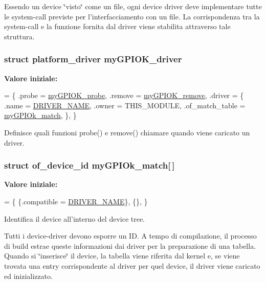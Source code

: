 Essendo un device \char`\"{}visto\char`\"{} come un file, ogni device driver deve implementare tutte le system-\/call previste per l'interfacciamento con un file. La corrispondenza tra la system-\/call e la funzione fornita dal driver viene stabilita attraverso tale struttura. \hypertarget{group___kernel-_module_ga8dba1541b58fa63f8208232ffce4fc47}{
\subsubsection[{my\+G\+P\+I\+O\+K\+\_\+driver}]{\setlength{\rightskip}{0pt plus 5cm}struct platform\+\_\+driver my\+G\+P\+I\+O\+K\+\_\+driver\hspace{0.3cm}{\ttfamily [static]}}}\label{group___kernel-_module_ga8dba1541b58fa63f8208232ffce4fc47}
{\bfseries Valore iniziale\+:}
\begin{DoxyCode}
= \{
        .probe = \hyperlink{group___kernel-_module_gae40973a06d72f7c41a9af07513a62307}{myGPIOK\_probe},
        .remove = \hyperlink{group___kernel-_module_ga59fddfaa36dea357f4bbdfceb0f47f8c}{myGPIOK\_remove},
        .driver = \{
                .name = \hyperlink{group___kernel-_module_ga25634d21648ca7fb7a2aca614bafaaeb}{DRIVER\_NAME},
                .owner = THIS\_MODULE,
                .of\_match\_table = \hyperlink{group___kernel-_module_ga91f28437e0a553effa546d16fa44f03a}{myGPIOk\_match},
        \},
\}
\end{DoxyCode}


Definisce quali funzioni probe() e remove() chiamare quando viene caricato un driver. 

\hypertarget{group___kernel-_module_ga91f28437e0a553effa546d16fa44f03a}{
\subsubsection[{my\+G\+P\+I\+Ok\+\_\+match}]{\setlength{\rightskip}{0pt plus 5cm}struct of\+\_\+device\+\_\+id my\+G\+P\+I\+Ok\+\_\+match\mbox{[}$\,$\mbox{]}\hspace{0.3cm}{\ttfamily [static]}}}\label{group___kernel-_module_ga91f28437e0a553effa546d16fa44f03a}
{\bfseries Valore iniziale\+:}
\begin{DoxyCode}
= \{
        \{.compatible = \hyperlink{group___kernel-_module_ga25634d21648ca7fb7a2aca614bafaaeb}{DRIVER\_NAME}\},
        \{\},
\}
\end{DoxyCode}


Identifica il device all'interno del device tree. 

Tutti i device-\/driver devono esporre un I\+D. A tempo di compilazione, il processo di build estrae queste informazioni dai driver per la preparazione di una tabella. Quando si \char`\"{}inserisce\char`\"{} il device, la tabella viene riferita dal kernel e, se viene trovata una entry corrispondente al driver per quel device, il driver viene caricato ed inizializzato. 